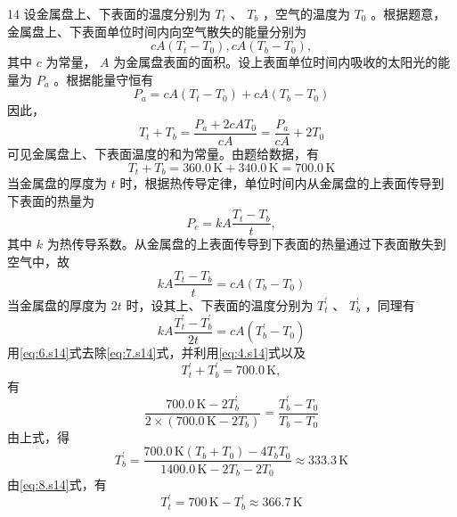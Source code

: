 \begin{solution}{14}
设金属盘上、下表面的温度分别为 $T_{t}$ 、 $T_{b}$ ，空气的温度为 $T_{0}$ 。根据题意，金属盘上、下表面单位时间内向空气散失的能量分别为
\begin{equation}
c A \left(T _ {t} - T _ {0}\right), c A \left(T _ {b} - T _ {0}\right),
\label{eq:1.s14}
\end{equation}
其中 $c$ 为常量， $A$ 为金属盘表面的面积。设上表面单位时间内吸收的太阳光的能量为 $P_{a}$ 。根据能量守恒有
\begin{equation}
P _ {a} = c A \left(T _ {t} - T _ {0}\right) + c A \left(T _ {b} - T _ {0}\right)
\label{eq:2.s14}
\end{equation}
因此，
\begin{equation}
T _ {t} + T _ {b} = \frac {P _ {a} + 2 c A T _ {0}}{c A} = \frac {P _ {a}}{c A} + 2 T _ {0}
\label{eq:3.s14}
\end{equation}
可见金属盘上、下表面温度的和为常量。由题给数据，有
\begin{equation}
T _ {t} + T _ {b} = 360.0\,\mathrm{K} + 340.0\,\mathrm{K} = 700.0\,\mathrm{K}
\label{eq:4.s14}
\end{equation}
当金属盘的厚度为 $t$ 时，根据热传导定律，单位时间内从金属盘的上表面传导到下表面的热量为
\begin{equation}
P _ {c} = k A \frac {T _ {t} - T _ {b}}{t},
\label{eq:5.s14}
\end{equation}
其中 $k$ 为热传导系数。从金属盘的上表面传导到下表面的热量通过下表面散失到空气中，故
\begin{equation}
k A \frac {T _ {t} - T _ {b}}{t} = c A \left(T _ {b} - T _ {0}\right)
\label{eq:6.s14}
\end{equation}
当金属盘的厚度为 $2t$ 时，设其上、下表面的温度分别为 $T_{t}^{\prime}$ 、 $T_{b}^{\prime}$ ，同理有
\begin{equation}
k A \frac {T _ {t} ^ {\prime} - T _ {b} ^ {\prime}}{2 t} = c A \left(T _ {b} ^ {\prime} - T _ {0}\right)
\label{eq:7.s14}
\end{equation}
用\eqref{eq:6.s14}式去除\eqref{eq:7.s14}式，并利用\eqref{eq:4.s14}式以及
\begin{equation}
T _ {t} ^ {\prime} + T _ {b} ^ {\prime} = 700.0\,\mathrm{K},
\label{eq:8.s14}
\end{equation}
有
\begin{equation}
\frac {700.0\,\mathrm{K} - 2 T _ {b} ^ {\prime}}{2 \times (700.0\,\mathrm{K} - 2 T _ {b})} = \frac {T _ {b} ^ {\prime} - T _ {0}}{T _ {b} - T _ {0}}
\label{eq:9.s14}
\end{equation}
由上式，得
\begin{equation}
T _ {b} ^ {\prime} = \frac {700.0\,\mathrm{K} \left(T _ {b} + T _ {0}\right) - 4 T _ {b} T _ {0}}{1400.0\,\mathrm{K} - 2 T _ {b} - 2 T _ {0}} \approx 333.3\,\mathrm{K}
\label{eq:10.s14}
\end{equation}
由\eqref{eq:8.s14}式，有
\begin{equation}
T _ {t} ^ {\prime} = 700\,\mathrm{K} - T _ {b} ^ {\prime} \approx 366.7\,\mathrm{K}
\label{eq:11.s14}
\end{equation}
\end{solution}